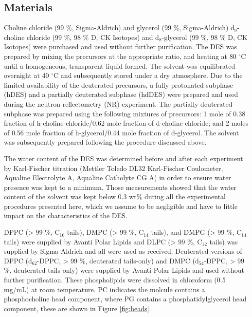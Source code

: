 \documentclass[twoside,twocolumn,9pt]{article}
\begin{document}
\subsection{Materials}
Choline chloride (99 \%, Sigma-Aldrich) and glycerol (99 \%, Sigma-Aldrich) d$_9$-choline chloride (99 \%, 98 \% D, CK Isotopes) and d$_8$-glycerol (99 \%, 98 \% D, CK Isotopes)  were purchased and used without further purification. The DES was prepared by mixing the precursors at the appropriate ratio, and heating at 80 $^\circ$C until a homogeneous, transparent liquid formed.\cite{Smith2014} The solvent was equilibrated overnight at 40 $^\circ$C and subsequently stored under a dry atmosphere. Due to the limited availability of the deuterated precursors, a fully protonated subphase (hDES) and a partially deuterated subphase (hdDES) were prepared and used during the neutron reflectometry (NR) experiment. The partially deuterated subphase was prepared using the following mixtures of precursors: 1 mole of 0.38 fraction of h-choline chloride/0.62 mole fraction of d-choline chloride; and 2 moles of 0.56 mole fraction of h-glycerol/0.44 mole fraction of d-glycerol. The solvent was subsequently prepared following the procedure discussed above.

The water content of the DES was determined before and after each experiment by Karl-Fischer titration (Mettler Toledo DL32 Karl-Fischer Coulometer, Aqualine Electrolyte A, Aqualine Catholyte CG A) in order to ensure water presence was kept to a minimum. Those measurements showed that the water content of the solvent was kept below 0.3 wt\% during all the experimental procedures presented here, which we assume to be negligible and have to little impact on the characteristics of the DES.\cite{Hammond2016,Hammond2017}

DPPC (> 99 \%, C$_{16}$ tails), DMPC (> 99 \%, C$_{14}$ tails), and DMPG (> 99 \%, C$_{14}$ tails) were supplied by Avanti Polar Lipids and DLPC (> 99 \%, C$_{12}$ tails) was supplied by Sigma-Aldrich and all were used as received. Deuterated versions of DPPC (d$_{62}$-DPPC, > 99 \%, deuterated tails-only) and DMPC (d$_{54}$-DPPC, > 99 \%, deuterated tails-only) were supplied by Avanti Polar Lipids and used without further purification. These phospholipids were dissolved in chloroform (0.5 mg/mL) at room temperature. PC indicates the molcule contains a phosphocholine head component, where PG contains a phosphatidylglycerol head component, these are shown in Figure \ref{fig:heads}.
\end{document}
